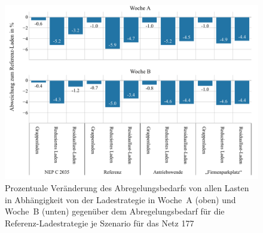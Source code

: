 \begin{figure}[H]
    \centering
    \includegraphics[width=\textwidth]{Bilder/177_cur_load_both_weeks}
    \caption{Prozentuale Veränderung des Abregelungsbedarfs von allen Lasten in Abhängigkeit von der Ladestrategie in Woche~A (oben) und Woche~B (unten) gegenüber dem Abregelungsbedarf für die Referenz-Ladestrategie je Szenario für das Netz \num{177}}\label{fig:177_cur_load_both_weeks}
\end{figure}